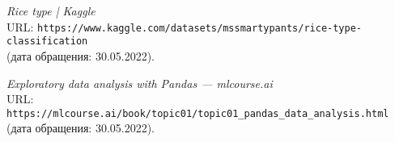 \begin{thebibliography}{99}
{\itshape Rice type | Kaggle}\\
URL: \texttt{https://www.kaggle.com/datasets/mssmartypants/rice-type-classification}\\
(дата обращения: 30.05.2022).

{\itshape Exploratory data analysis with Pandas --- mlcourse.ai}\\
URL: \texttt{https://mlcourse.ai/book/topic01/topic01\_pandas\_data\_analysis.html}\\
(дата обращения: 30.05.2022).

\end{thebibliography}
\pagebreak
